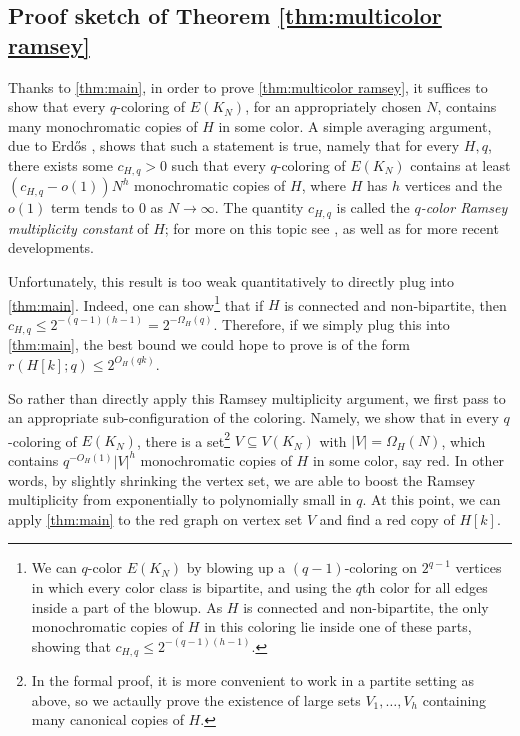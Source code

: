 \documentclass{aic}
\theoremstyle{plain}
\theoremstyle{remark}
\newcommand\ab[1]{\lvert #1 \rvert}
\begin{document}
\subsection{Proof sketch of Theorem \ref{thm:multicolor ramsey}}
Thanks to \cref{thm:main}, in order to prove \cref{thm:multicolor ramsey}, it suffices to show that every $q$-coloring of $E(K_N)$, for an appropriately chosen $N$, contains many monochromatic copies of $H$ in some color. 
A simple averaging argument, due to Erd\H os \cite{MR0151956}, shows that such a statement is true, namely that for every $H,q$, there exists some $c_{H,q}>0$ such that every $q$-coloring of $E(K_N)$ contains at least $(c_{H,q}-o(1))N^h$ monochromatic copies of $H$, where $H$ has $h$ vertices and the $o(1)$ term tends to $0$ as $N \to \infty$. The quantity $c_{H,q}$ is called the \emph{$q$-color Ramsey multiplicity constant} of $H$; for more on this topic see \cite[Section 2.6]{MR3497267}, as well as \cite{2206.05800,MR4618272,MR4426765} for more recent developments. 

Unfortunately, this result is too weak quantitatively to directly plug into \cref{thm:main}. Indeed, one can show\footnote{We can $q$-color $E(K_N)$ by blowing up a $(q-1)$-coloring on $2^{q-1}$ vertices in which every color class is bipartite, and using the $q$th color for all edges inside a part of the blowup. As $H$ is connected and non-bipartite, the only monochromatic copies of $H$ in this coloring lie inside one of these parts, showing that $c_{H,q} \leq 2^{-(q-1)(h-1)}$.} that 
if $H$ is connected and non-bipartite, then $c_{H,q} \leq 2^{-(q-1)(h-1)} =2^{-\Omega_H(q)}$. Therefore, if we simply plug this into \cref{thm:main}, the best bound we could hope to prove is of the form $r(H[k];q) \leq 2^{O_H(qk)}$.

So rather than directly apply this Ramsey multiplicity argument, we first pass to an appropriate sub-configuration of the coloring. Namely, we show that in every $q$-coloring of $E(K_N)$, there is a set\footnote{In the formal proof, it is more convenient to work in a partite setting as above, so we actaully prove the existence of large sets $V_1,\dots,V_h$ containing many canonical copies of $H$.} $V \subseteq V(K_N)$ with $\ab V = \Omega_H(N)$, which contains $q^{-O_H(1)} \ab V^h$ monochromatic copies of $H$ in some color, say red. In other words, by slightly shrinking the vertex set, we are able to boost the Ramsey multiplicity from exponentially to polynomially small in $q$. At this point, we can apply \cref{thm:main} to the red graph on vertex set $V$ and find a red copy of $H[k]$.
\end{document}
